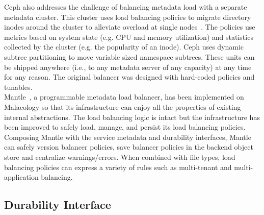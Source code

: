  Ceph
also addresses the challenge of balancing  metadata
load with a separate metadata cluster. This cluster uses load balancing
policies to migrate directory inodes around the cluster to alleviate overload
at single nodes~\cite{weil:sc2004-dyn-metadata}.  The policies use metrics
based on system state (e.g.  CPU and memory utilization) and statistics
collected by the cluster (e.g. the popularity of an inode). Ceph uses dynamic
subtree partitioning to move variable sized namespace subtrees. These units can
be shipped anywhere (i.e., to any metadata server of any capacity) at any time
for any reason. The original balancer was designed with hard-coded policies and
tunables.\\

 Mantle~\cite{sevilla:sc15-mantle}, a
programmable metadata load balancer, has been
implemented on Malacology so that its infrastructure can enjoy all the
properties of existing internal abstractions.  The load balancing logic is
intact but the infrastructure has been improved to safely load, manage, and
persist its load balancing policies.  Composing Mantle with the service
metadata and durability interfaces, Mantle can safely version balancer
policies, save balancer policies in the backend object store and centralize
warnings/errors. When combined with file types, load balancing policies can
express a variety of rules such as multi-tenant and multi-application
balancing.

 

\subsection{Durability Interface}
\label{sec:durability}



